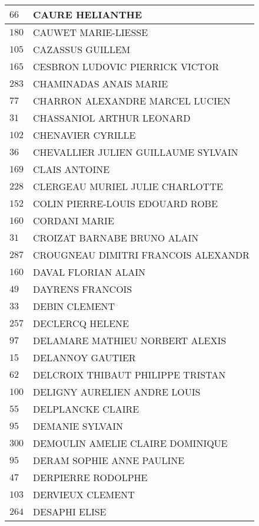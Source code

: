 \begin{xltabular}{\linewidth}{|l|X|}
    \hline
    $66$ & CAURE HELIANTHE \\
    \hline
    $180$ & CAUWET MARIE-LIESSE \\
    \hline
    $105$ & CAZASSUS GUILLEM \\
    \hline
    $165$ & CESBRON LUDOVIC PIERRICK VICTOR \\
    \hline
    $283$ & CHAMINADAS ANAIS MARIE \\
    \hline
    $77$ & CHARRON ALEXANDRE MARCEL LUCIEN \\
    \hline
    $31$ & CHASSANIOL ARTHUR LEONARD \\
    \hline
    $102$ & CHENAVIER CYRILLE \\
    \hline
    $36$ & CHEVALLIER JULIEN GUILLAUME SYLVAIN \\
    \hline
    $169$ & CLAIS ANTOINE \\
    \hline
    $228$ & CLERGEAU MURIEL JULIE CHARLOTTE \\
    \hline
    $152$ & COLIN PIERRE-LOUIS EDOUARD ROBE \\
    \hline
    $160$ & CORDANI MARIE \\
    \hline
    $31$ & CROIZAT BARNABE BRUNO ALAIN \\
    \hline
    $287$ & CROUGNEAU DIMITRI FRANCOIS ALEXANDR \\
    \hline
    $160$ & DAVAL FLORIAN ALAIN \\
    \hline
    $49$ & DAYRENS FRANCOIS \\
    \hline
    $33$ & DEBIN CLEMENT \\
    \hline
    $257$ & DECLERCQ HELENE \\
    \hline
    $97$ & DELAMARE MATHIEU NORBERT ALEXIS \\
    \hline
    $15$ & DELANNOY GAUTIER \\
    \hline
    $62$ & DELCROIX THIBAUT PHILIPPE TRISTAN \\
    \hline
    $100$ & DELIGNY AURELIEN ANDRE LOUIS \\
    \hline
    $55$ & DELPLANCKE CLAIRE \\
    \hline
    $95$ & DEMANIE SYLVAIN \\
    \hline
    $300$ & DEMOULIN AMELIE CLAIRE DOMINIQUE \\
    \hline
    $95$ & DERAM SOPHIE ANNE PAULINE \\
    \hline
    $47$ & DERPIERRE RODOLPHE \\
    \hline
    $103$ & DERVIEUX CLEMENT \\
    \hline
    $264$ & DESAPHI ELISE \\

\end{xltabular}
